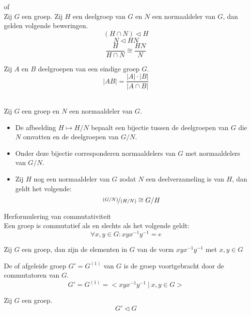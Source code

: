 \documentclass[main.tex]{subfiles}
\begin{document}
\begin{st}
 of \\
Zij $G$ een groep. Zij $H$ een deelgroep van $G$ en $N$ een normaaldeler van $G$, dan gelden volgende beweringen.
\[ (H \cap N) \triangleleft H \]
\[ N \triangleleft HN \]
\[ \frac{H}{H\cap N} \cong \frac{HN}{N} \]
\end{st}

\begin{st}
Zij $A$ en $B$ deelgroepen van een eindige groep $G$.
\[ |AB| = \frac{|A|\cdot|B|}{|A\cap B|} \]
\end{st}

\begin{st}
\\
Zij $G$ een groep en $N$ een normaaldeler van $G$.
\begin{itemize}
\item De afbeelding $H \mapsto H/N$ bepaalt een bijectie tussen de deelgroepen van $G$ die $N$ omvatten en de deelgroepen van $G/N$.
\item Onder deze bijectie corresponderen normaaldelers van $G$ met normaaldelers van $G/N$.
\item Zij $H$ nog een normaaldeler van $G$ zodat $N$ een deelverzameling is van $H$, dan geldt het volgende:
\[ \nicefrac{(G/N)}{(H/N)} \cong G/H\]
\end{itemize}
\end{st}

\begin{st}
Herformulering van commutativiteit\\
Een groep is commutatief als en slechts als het volgende geldt:
\[ \forall x,y \in G: xyx^{-1}y^{-1} = e \]
\end{st}

\begin{de}
Zij $G$ een groep, dan zijn de elementen in $G$ van de vorm $xyx^{-1}y^{-1}$ met $x,y\in G$ 
\end{de}

\begin{de}
De  of afgeleide groep $G' = G^{(1)}$ van $G$ is de groep voortgebracht door de commutatoren van $G$.
\[ G' = G^{(1)} = < xyx^{-1}y^{-1} \ |\ x,y\in G > \]
\end{de}

\begin{st}
Zij $G$ een groep.
\[ G' \triangleleft G \]
\end{st}
\end{document}
